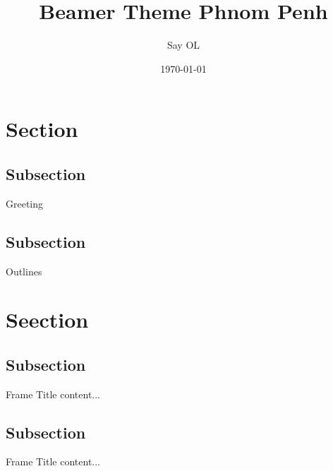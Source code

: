 \documentclass{beamer}
\title[beamerthemePhnomPenh.sty]{Beamer Theme Phnom Penh}
\author[Say]{Say OL}
\institute[RUPP]{Royal University of Phnom Penh}
\date{\today}
\begin{document}
\section{Section}
	\subsection{Subsection}
	\begin{frame}{Greeting}
		\titlepage
	\end{frame}
	\subsection{Subsection}
	\begin{frame}{Outlines}
		\tableofcontents
	\end{frame}
\section{Seection}
	\subsection{Subsection}
	\begin{frame}{Frame Title}
		content...
	\end{frame}
	\subsection{Subsection}
	\begin{frame}{Frame Title}
		content...
	\end{frame}
\end{document}
